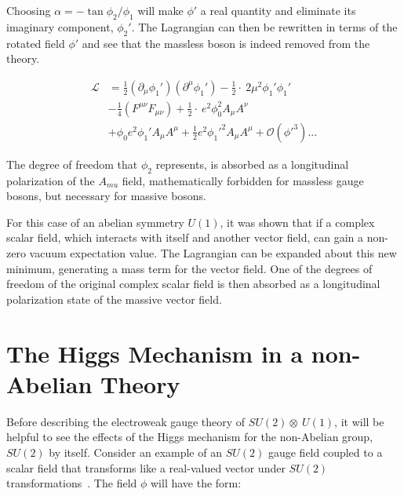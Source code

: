 \noindent Choosing $\alpha = -\tan{\phi_{2}/\phi_{1}}$ will make $\phi'$
 a real quantity and eliminate its imaginary component, $\phi_{2}'$.
 The Lagrangian can then be rewritten in terms of the rotated field
 $\phi'$ and see that the massless boson is indeed removed from the
 theory.

\begin{equation}\label{eq:abelian_higgs_mechanism_final_lagrangian}
\begin{aligned}
\mathcal{L} & =
\frac{1}{2}(\partial_{\mu}\phi_{1}')(\partial^{\mu}\phi_{1}') -
\frac{1}{2}\cdot~2\mu^{2}\phi_{1}'\phi_{1}' \\
&  -\frac{1}{4}(F^{\mu\nu}F_{\mu\nu}) +
\frac{1}{2}\cdot~e^{2}\phi_{0}^{2}A_{\mu}A^{\nu} \\
&  + \phi_{0}e^{2}\phi_{1}'A_{\mu}A^{\mu} +
\frac{1}{2}e^2\phi_{1}'^{2}A_{\mu}A^{\mu} + \mathcal{O}(\phi'^{3})...
\end{aligned}
\end{equation}

\par The degree of freedom that $\phi_{2}$ represents, is absorbed as
a longitudinal polarization of the $A_{mu}$ field, mathematically forbidden for
massless gauge bosons, but necessary for massive bosons.  

\par For this case of an abelian symmetry $U(1)$, it was shown that if a
complex scalar field, which interacts with itself and another vector
field, can gain a non-zero vacuum expectation value.  The Lagrangian can
be expanded about this new minimum, generating a mass term for the
vector field.  One of the degrees of freedom of the original complex
scalar field is then absorbed as a longitudinal polarization state of
the massive vector field.  

\section{The Higgs Mechanism in a non-Abelian Theory}
\label{non_abelian_higgs_mechanism_overview}

\par Before describing the electroweak gauge theory of
$SU(2)\otimes~U(1)$, it will be helpful to see the effects of the
Higgs mechanism for the non-Abelian group, $SU(2)$ by itself.  Consider an
example of an $SU(2)$ gauge field coupled to a scalar field that
transforms like a real-valued vector under $SU(2)$
transformations~\cite{Peskin_Schroeder}.  The field $\phi$ will have
the form:

